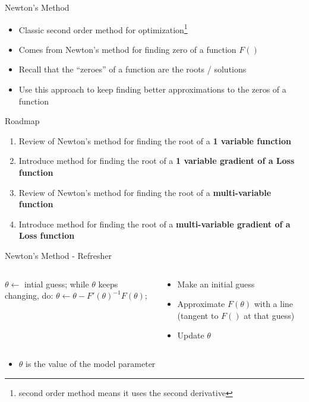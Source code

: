 \documentclass[aspectratio=169]{beamer}
\newenvironment{noindentitemize}
{ \begin{itemize}
 \setlength{\itemsep}{1.5ex}
  \setlength{\parsep}{0pt}   
  \setlength{\parskip}{0pt}
 \addtolength{\leftskip}{-2em}
 }
{ \end{itemize} }
\begin{document}
\begin{frame}{Newton's Method}

\begin{itemize}
\item Classic second order method for optimization\footnote {second order method means it uses the second derivative} 
\item Comes from Newton's method for finding zero of a function $F()$ 
\item Recall that the ``zeroes'' of a function are the roots / solutions
\item Use this approach to keep finding better approximations to the zeros of a function
\end{itemize}
\end{frame}
\begin{frame}{Roadmap}

\begin{enumerate}
	\item Review of Newton's method for finding the root of a \textbf{1 variable function}
	\item Introduce method for finding the root of a \textbf{1 variable gradient of a Loss function}
	\item Review of Newton's method for finding the root of a \textbf{multi-variable function}
	\item Introduce method for finding the root of a \textbf{multi-variable gradient of a Loss function}
\end{enumerate}
\end{frame}
\begin{frame}[fragile]{Newton's Method - Refresher}

\begin{columns}[T]
\begin{column}{0.5\textwidth}
\begin{SQL}
$\theta \leftarrow$ intial guess;
while $\theta$ keeps changing, do:
  $\theta \leftarrow \theta - F'(\theta)^{-1}F(\theta)$; 
\end{SQL}
\end{column}
\begin{column}{0.5\textwidth}
\begin{itemize}
\item Make an initial guess
\item Approximate $F(\theta)$ with a  line (tangent to $F()$ at that guess) %
\item Update $\theta$
\end{itemize}
\end{column}
\end{columns}
\begin{noindentitemize}
\item $\theta$ is the value of the model parameter
\end{noindentitemize}
\end{frame}
\end{document}
